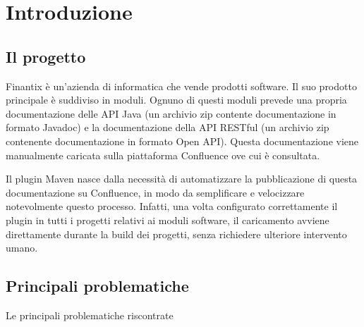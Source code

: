 
\chapter{Introduzione}
\label{cap:introduzione}





\section{Il progetto}
Finantix è un'azienda di informatica che vende prodotti software.
Il suo prodotto principale è suddiviso in moduli.
Ognuno di questi moduli prevede una propria documentazione delle API Java (un archivio zip contente documentazione in formato Javadoc) e la documentazione della API RESTful (un archivio zip contenente documentazione in formato Open API).
Questa documentazione viene manualmente caricata sulla piattaforma Confluence ove cui è consultata. 

Il plugin Maven nasce dalla necessità di automatizzare la pubblicazione di questa documentazione su Confluence, in modo da semplificare e velocizzare notevolmente questo processo.
Infatti, una volta configurato correttamente il plugin in tutti i progetti relativi ai moduli software, il caricamento avviene direttamente durante la build dei progetti, senza richiedere ulteriore intervento umano.

\section{Principali problematiche}
Le principali problematiche riscontrate 

